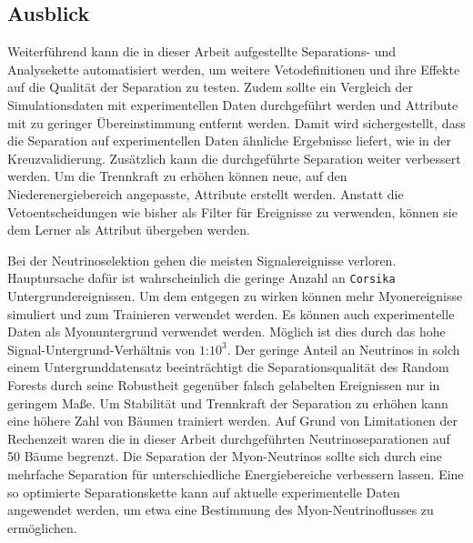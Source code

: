 \subsection*{Ausblick}

Weiterführend kann die in dieser Arbeit aufgestellte Separations- und Analysekette automatisiert werden, um weitere Vetodefinitionen und ihre Effekte auf die Qualität der Separation zu testen.
Zudem sollte ein Vergleich der Simulationsdaten mit experimentellen Daten durchgeführt werden und Attribute mit zu geringer Übereinstimmung entfernt werden.
Damit wird sichergestellt, dass die Separation auf experimentellen Daten ähnliche Ergebnisse liefert, wie in der Kreuzvalidierung.
Zusätzlich kann die durchgeführte Separation weiter verbessert werden.
Um die Trennkraft zu erhöhen können neue, auf den Niederenergiebereich angepasste, Attribute erstellt werden.
Anstatt die Vetoentscheidungen wie bisher als Filter für Ereignisse zu verwenden, können sie dem Lerner als Attribut übergeben werden.

Bei der Neutrinoselektion gehen die meisten Signalereignisse verloren.
Hauptursache dafür ist wahrscheinlich die geringe Anzahl an \texttt{Corsika} Untergrund\-ereignissen.
Um dem entgegen zu wirken können mehr Myonereignisse simuliert und zum Trainieren verwendet werden.
Es können auch experimentelle Daten als Myonuntergrund verwendet werden.
Möglich ist dies durch das hohe Signal-Untergrund-Verhältnis von $1$:$10^3$.
Der geringe Anteil an Neutrinos in solch einem Untergrunddatensatz beeinträchtigt die Separationsqualität des Random Forests durch seine Robustheit gegenüber falsch gelabelten Ereignissen nur in geringem Maße.
Um Stabilität und Trennkraft der Separation zu erhöhen kann eine höhere Zahl von Bäumen trainiert werden.
Auf Grund von Limitationen der Rechenzeit waren die in dieser Arbeit durchgeführten Neutrinoseparationen auf 50 Bäume begrenzt.
Die Separation der Myon-Neutrinos sollte sich durch eine mehrfache Separation für unterschiedliche Energiebereiche verbessern lassen.
Eine so optimierte Separationskette kann auf aktuelle experimentelle Daten angewendet werden, um etwa eine Bestimmung des Myon-Neutrinoflusses zu ermöglichen. 
